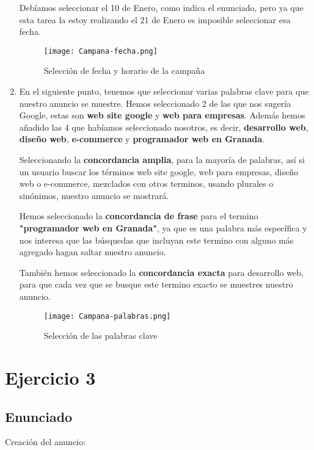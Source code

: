 \begin{enumerate}
    Debíamos seleccionar el 10 de Enero, como indica el enunciado, pero ya que esta tarea la estoy realizando el 21 de Enero es imposible seleccionar esa fecha.

    \begin{figure}[H]
        \centering
        \texttt{[image: Campana-fecha.png]}
        \caption{Selección de fecha y horario de la campaña}
    \end{figure}

    \item En el siguiente punto, tenemos que seleccionar varias palabras clave para que nuestro anuncio se muestre. Hemos seleccionado 2 de las que nos sugería Google, estas son \textbf{web site google} y \textbf{web para empresas}. Además hemos añadido las 4 que habíamos seleccionado nosotros, es decir, \textbf{desarrollo web}, \textbf{diseño web}, \textbf{e-commerce} y \textbf{programador web en Granada}.

    Seleccionando la \textbf{concordancia amplia}, para la mayoría de palabras, así si un usuario buscar los términos web site google, web para empresas, diseño web o e-commerce, mezclados con otros terminos, usando plurales o sinónimos, nuestro anuncio se mostrará.

    Hemos seleccionado la \textbf{concordancia de frase} para el termino \textbf{"programador web en Granada"}, ya que es una palabra más específica y nos interesa que las búsquedas que incluyan este termino con alguno más agregado hagan saltar nuestro anuncio.

    También hemos seleccionado la \textbf{concordancia exacta} para desarrollo web, para que cada vez que se busque este termino exacto se muestres nuestro anuncio.

    \begin{figure}[H]
        \centering
        \texttt{[image: Campana-palabras.png]}
        \caption{Selección de las palabras clave}
    \end{figure}
\end{enumerate}

\section{Ejercicio 3}

\subsection{Enunciado}
Creación del anuncio:

